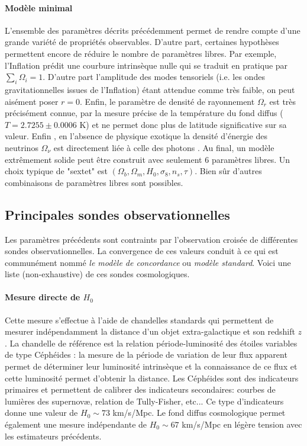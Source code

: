 \paragraph{Modèle minimal} L'ensemble des paramètres décrits précédemment permet de rendre compte d'une grande variété de propriétés observables. D'autre part, certaines hypothèses permettent encore de réduire le nombre de paramètres libres. Par exemple, l'Inflation prédit une courbure intrinsèque nulle qui se traduit en pratique par $\sum_i \Omega_i=1$. D'autre part l'amplitude des modes tensoriels (i.e. les ondes gravitationnelles issues de l'Inflation) étant attendue comme très faible, on peut aisément poser $r=0$. Enfin, le paramètre de densité de rayonnement $\Omega_r$ est très précisément connue, par la mesure précise de la température  du fond diffus ($T=2.7255\pm0.0006$ K) et ne permet donc plus de latitude significative sur sa valeur. Enfin , en l'absence de physique exotique la densité d'énergie des neutrinos $\Omega_\nu$ est directement liée à celle des photons . Au final, un modèle extrêmement solide peut être construit avec seulement 6 paramètres libres. Un choix typique de "sextet" est $(\Omega_b,\Omega_m, H_0,\sigma_8,n_s,\tau)$. Bien sûr d'autres combinaisons de paramètres libres sont possibles.

\subsection{Principales sondes observationnelles}

Les paramètres précédents sont contraints par l'observation croisée de différentes sondes observationnelles. La convergence de ces valeurs conduit à ce qui est communément nommé \textit{le modèle de concordance} ou \textit{modèle standard}. Voici une liste (non-exhaustive) de ces sondes cosmologiques.

\paragraph{Mesure directe de $H_0$}
Cette mesure s'effectue à l'aide de chandelles standards qui permettent de mesurer indépendamment la distance d'un objet extra-galactique et son redshift $z$. La chandelle de référence est la relation période-luminosité des étoiles variables de type Céphéides : la mesure de la période de variation de leur flux apparent permet de déterminer leur luminosité intrinsèque  et la connaissance de ce flux et cette luminosité permet d'obtenir la distance. Les Céphéides sont des indicateurs primaires et permettent de calibrer des indicateurs secondaires: courbes de lumières des supernovæ, relation de Tully-Fisher, etc... Ce type d'indicateurs donne une valeur de $H_0\sim 73$ km/s/Mpc. Le fond diffus cosmologique permet également une mesure indépendante de $H_0\sim 67$ km/s/Mpc en légère tension avec les estimateurs précédents.

